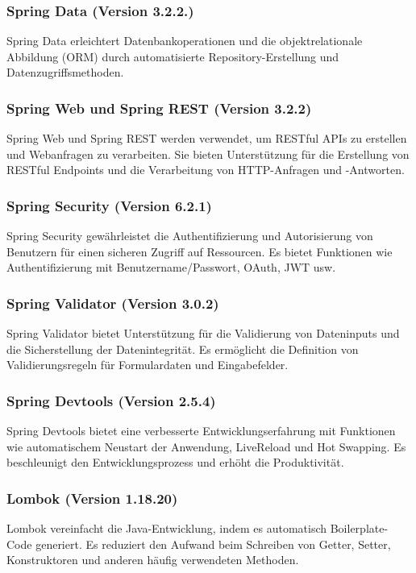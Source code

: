 		\subsubsection{Spring Data (Version 3.2.2.)}
	Spring Data erleichtert Datenbankoperationen und die objektrelationale Abbildung (ORM) durch automatisierte Repository-Erstellung und Datenzugriffsmethoden.
	
	\subsubsection{Spring Web und Spring REST (Version 3.2.2)}
	Spring Web und Spring REST werden verwendet, um RESTful APIs zu erstellen und Webanfragen zu verarbeiten. Sie bieten Unterstützung für die Erstellung von RESTful Endpoints und die Verarbeitung von HTTP-Anfragen und -Antworten.
	

	
	\subsubsection{Spring Security (Version 6.2.1)}
	Spring Security gewährleistet die Authentifizierung und Autorisierung von Benutzern für einen sicheren Zugriff auf Ressourcen. Es bietet Funktionen wie Authentifizierung mit Benutzername/Passwort, OAuth, JWT usw.
	
	\subsubsection{Spring Validator (Version 3.0.2)}
	Spring Validator bietet Unterstützung für die Validierung von Dateninputs und die Sicherstellung der Datenintegrität. Es ermöglicht die Definition von Validierungsregeln für Formulardaten und Eingabefelder.
	
	\subsubsection{Spring Devtools (Version 2.5.4)}
	Spring Devtools bietet eine verbesserte Entwicklungserfahrung mit Funktionen wie automatischem Neustart der Anwendung, LiveReload und Hot Swapping. Es beschleunigt den Entwicklungsprozess und erhöht die Produktivität.
	
	\subsubsection{Lombok (Version 1.18.20)}
	Lombok vereinfacht die Java-Entwicklung, indem es automatisch Boilerplate-Code generiert. Es reduziert den Aufwand beim Schreiben von Getter, Setter, Konstruktoren und anderen häufig verwendeten Methoden.
	
